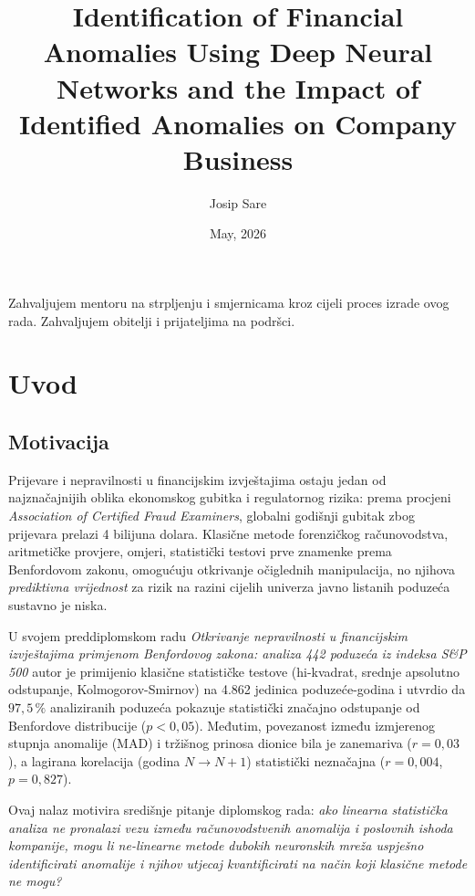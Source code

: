 \documentclass[diplomskirad,authoryear]{fer}
\title{Identification of Financial Anomalies Using Deep Neural Networks and the Impact of Identified Anomalies on Company Business}
\author{Josip Sare}
\date{May, 2026}
\begin{document}
\maketitle




\begin{zahvale}
Zahvaljujem mentoru na strpljenju i smjernicama kroz cijeli proces izrade ovog rada. Zahvaljujem obitelji i prijateljima na podršci.
\end{zahvale}


\mainmatter


\tableofcontents


\chapter{Uvod}

\section{Motivacija}

Prijevare i nepravilnosti u financijskim izvještajima ostaju jedan od najznačajnijih oblika ekonomskog gubitka i regulatornog rizika: prema procjeni \emph{Association of Certified Fraud Examiners}, globalni godišnji gubitak zbog prijevara prelazi 4 bilijuna dolara. Klasične metode forenzičkog računovodstva, aritmetičke provjere, omjeri, statistički testovi prve znamenke prema Benfordovom zakonu, omogućuju otkrivanje očiglednih manipulacija, no njihova \emph{prediktivna vrijednost} za rizik na razini cijelih univerza javno listanih poduzeća sustavno je niska.

U svojem preddiplomskom radu \emph{Otkrivanje nepravilnosti u financijskim izvještajima primjenom Benfordovog zakona: analiza 442 poduzeća iz indeksa S\&P 500} autor je primijenio klasične statističke testove (hi-kvadrat, srednje apsolutno odstupanje, Kolmogorov-Smirnov) na 4.862 jedinica poduzeće-godina i utvrdio da $97{,}5\,\%$ analiziranih poduzeća pokazuje statistički značajno odstupanje od Benfordove distribucije ($p<0{,}05$). Međutim, povezanost između izmjerenog stupnja anomalije (MAD) i tržišnog prinosa dionice bila je zanemariva ($r=0{,}03$), a lagirana korelacija (godina $N \to N+1$) statistički neznačajna ($r=0{,}004$, $p=0{,}827$).

Ovaj nalaz motivira središnje pitanje diplomskog rada: \emph{ako linearna statistička analiza ne pronalazi vezu između računovodstvenih anomalija i poslovnih ishoda kompanije, mogu li ne-linearne metode dubokih neuronskih mreža uspješno identificirati anomalije i njihov utjecaj kvantificirati na način koji klasične metode ne mogu?}
\end{document}
